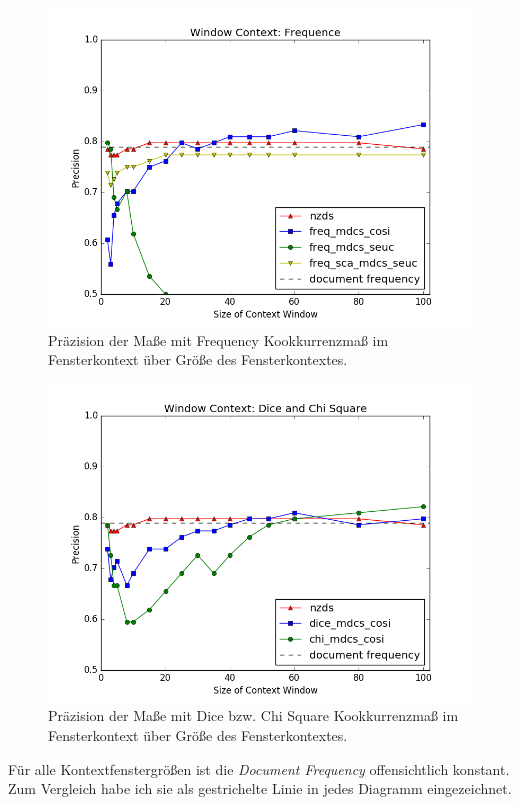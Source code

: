 \documentclass[11pt,numbers=noenddot]{scrartcl}
\begin{document}
\begin{figure}
    \includegraphics[width = \textwidth]{win_freq}
    \caption{Präzision der Maße mit Frequency Kookkurrenzmaß im Fensterkontext über Größe des Fensterkontextes.}
    \label{win_freq}
\end{figure}
\begin{figure}
    \includegraphics[width = \textwidth]{win_dice_chi}
    \caption{Präzision der Maße mit Dice bzw. Chi Square Kookkurrenzmaß im Fensterkontext über Größe des Fensterkontextes.}
    \label{win_dice_chi}
\end{figure}
Für alle Kontextfenstergrößen ist die \emph{Document Frequency} offensichtlich konstant. Zum Vergleich habe ich sie als gestrichelte Linie in jedes Diagramm eingezeichnet.
\end{document}

